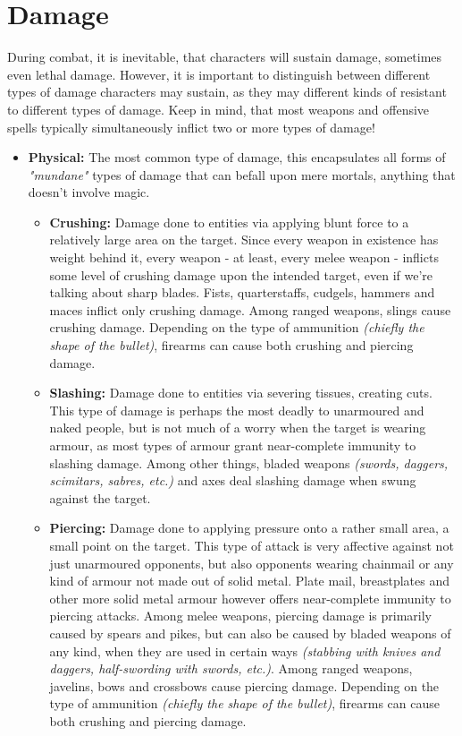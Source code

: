 \documentclass[tikz,openany,11pt,a4paper]{book}
\begin{document}
\section{Damage}
During combat, it is inevitable, that characters will sustain damage, sometimes even lethal damage. However, it is important to distinguish between different types of damage characters may sustain, as they may different kinds of resistant to different types of damage. Keep in mind, that most weapons and offensive spells typically simultaneously inflict two or more types of damage!
\begin{itemize}
\item \textbf{Physical:} The most common type of damage, this encapsulates all forms of \textit{"mundane"} types of damage that can befall upon mere mortals, anything that doesn't involve magic.
	\begin{itemize}[label=$\star$]
		\item \textbf{Crushing:} Damage done to entities via applying blunt force to a relatively large area on the target. Since every weapon in existence has weight behind it, every weapon - at least, every melee weapon - inflicts some level of crushing damage upon the intended target, even if we're talking about sharp blades. Fists, quarterstaffs, cudgels, hammers and maces inflict only crushing damage. Among ranged weapons, slings cause crushing damage. Depending on the type of ammunition \textit{(chiefly the shape of the bullet)}, firearms can cause both crushing and piercing damage.
		\item \textbf{Slashing:} Damage done to entities via severing tissues, creating cuts. This type of damage is perhaps the most deadly to unarmoured and naked people, but is not much of a worry when the target is wearing armour, as most types of armour grant near-complete immunity to slashing damage. Among other things, bladed weapons \textit{(swords, daggers, scimitars, sabres, etc.)} and axes deal slashing damage when swung against the target.
		\item \textbf{Piercing:} Damage done to applying pressure onto a rather small area, a small point on the target. This type of attack is very affective against not just unarmoured opponents, but also opponents wearing chainmail or any kind of armour not made out of solid metal. Plate mail, breastplates and other more solid metal armour however offers near-complete immunity to piercing attacks. Among melee weapons, piercing damage is primarily caused by spears and pikes, but can also be caused by bladed weapons of any kind, when they are used in certain ways \textit{(stabbing with knives and daggers, half-swording with swords, etc.)}. Among ranged weapons, javelins, bows and crossbows cause piercing damage.  Depending on the type of ammunition \textit{(chiefly the shape of the bullet)}, firearms can cause both crushing and piercing damage.

\end{itemize}
\end{itemize}
\end{document}
